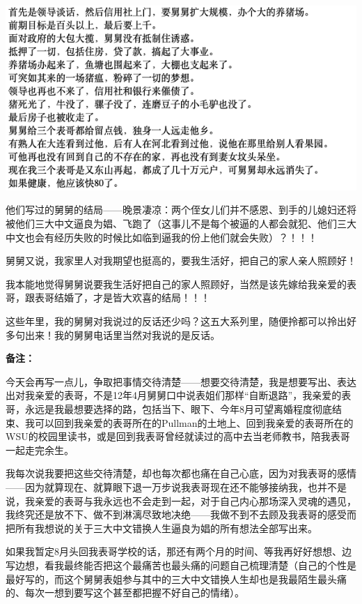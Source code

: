 \documentclass[9pt, b5paper]{article}
\begin{document}
\begin{center}
\includegraphics[width=.9\linewidth]{./pic/readme_20210520_095719.png}
\end{center}

他们写过的舅舅的结局——晚景凄凉：两个侄女儿们并不感恩、到手的儿媳妇还将被他们三大中文逼良为娼、飞跑了（这事儿不是每个被逼的人都会就犯、他们三大中文也会有经历失败的时候比如临到逼我的份上他们就会失败）？！！！

舅舅又说，我家里人对我期望也挺高的，要我生活好，把自己的家人亲人照顾好！

我本能地觉得舅舅说要我生活好把自己的家人照顾好，当然是该先嫁给我亲爱的表哥，跟表哥结婚了，才是皆大欢喜的结局！！！

这些年里，我的舅舅对我说过的反话还少吗？这五大系列里，随便拎都可以拎出好多句出来！我的舅舅电话里当然对我说的是反话。 

\textbf{备注：}

今天会再写一点儿，争取把事情交待清楚——想要交待清楚，我是想要写出、表达出对我亲爱的表哥，不是12年4月舅舅口中说表姐们那样“自断退路”，我亲爱的表哥，永远是我最想要选择的路，包括当下、眼下、今年8月可望离婚程度彻底结束、我可以回到我亲爱的表哥所在的Pullman的土地上、回到我亲爱的表哥所在的WSU的校园里读书，或是回到我表哥曾经就读过的高中去当老师教书，陪我表哥一起走完余生。

我每次说我要把这些交待清楚，却也每次都也痛在自己心底，因为对我表哥的感情——因为就算现在、就算眼下退一万步说我表哥现在还不能够接纳我，也并不是说，我亲爱的表哥与我永远也不会走到一起，对于自己内心那场深入灵魂的遇见，我终究还是放不下、做不到淋漓尽致地决绝——我做不到不去顾及我表哥的感受而把所有我想说的关于三大中文错换人生逼良为娼的所有想法全部写出来。

如果我暂定8月头回我表哥学校的话，那还有两个月的时间、等我再好好想想、边写边想，看我最终能否把这个最痛苦也最头痛的问题自己梳理清楚（自己的个性是最好写的，而这个舅舅表姐参与其中的三大中文错换人生却也是我最陌生最头痛的、每次一想到要写这个甚至都把握不好自己的情绪）。
\end{document}
